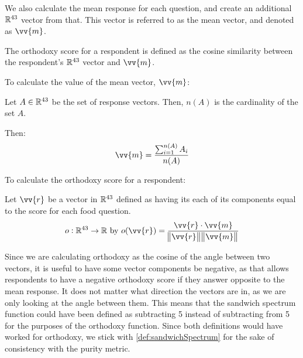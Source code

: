 We also calculate the mean response for each question, and create an additional $\mathbb{R}^{43}$ vector from that.
This vector is referred to as the mean vector, and denoted as $\vv{m}$.

The orthodoxy score for a respondent is defined as the cosine similarity between the respondent's $\mathbb{R}^{43}$ vector and $\vv{m}$.

\begin{definition}
	To calculate the value of the mean vector, $\vv{m}$:

	Let $A \in \mathbb{R}^{43}$ be the set of response vectors.
	Then, $n(A)$ is the cardinality of the set $A$.

	Then:
	\begin{equation}
		\vv{m} = \frac{\sum_{i = 1}^{n(A)} A_i}{n(A)}
	\end{equation}
\end{definition}

\begin{definition}
	To calculate the orthodoxy score for a respondent:

	Let $\vv{r}$ be a vector in $\mathbb{R}^{43}$ defined as having its each of its components equal to the score for each food question.
	\begin{equation}
		o \from \real^{43} \to \real\ \text{by}\ o(\vv{r}) = \frac{\vv{r} \cdot \vv{m}}{\norm{\vv{r}} \norm{\vv{m}}}
	\end{equation}
\end{definition}

Since we are calculating orthodoxy as the cosine of the angle between two vectors, it is useful to have some vector components be negative, as that allows respondents to have a negative orthodoxy score if they answer opposite to the mean response.
It does not matter what direction the vectors are in, as we are only looking at the angle between them.
This means that the sandwich spectrum function could have been defined as subtracting 5 instead of subtracting from 5 for the purposes of the orthodoxy function.
Since both definitions would have worked for orthodoxy, we stick with \vref{def:sandwichSpectrum} for the sake of consistency with the purity metric.
